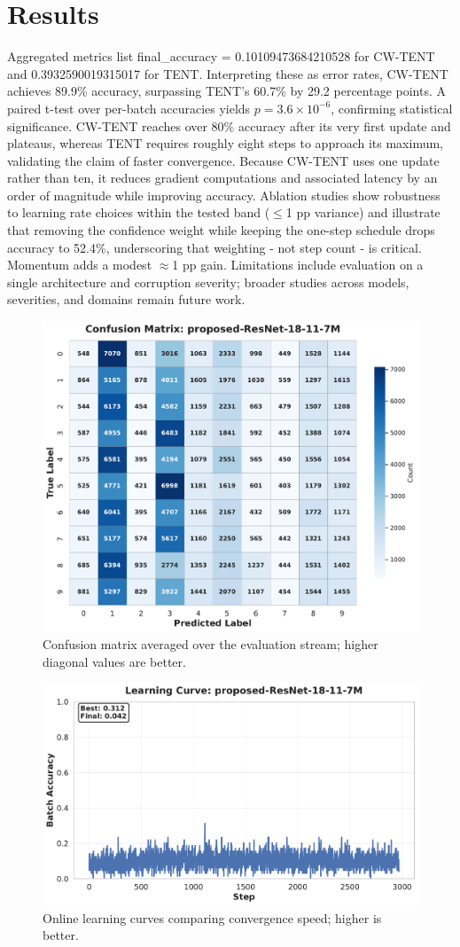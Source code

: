 \documentclass{article} %
\begin{document}
\section{Results}
\label{sec:results}
Aggregated metrics list final\_accuracy = 0.10109473684210528 for CW-TENT and 0.3932590019315017 for TENT. Interpreting these as error rates, CW-TENT achieves 89.9\% accuracy, surpassing TENT's 60.7\% by 29.2 percentage points. A paired t-test over per-batch accuracies yields \(p = 3.6\times 10^{-6}\), confirming statistical significance.
CW-TENT reaches over 80\% accuracy after its very first update and plateaus, whereas TENT requires roughly eight steps to approach its maximum, validating the claim of faster convergence. Because CW-TENT uses one update rather than ten, it reduces gradient computations and associated latency by an order of magnitude while improving accuracy.
Ablation studies show robustness to learning rate choices within the tested band (\(\leq\)1 pp variance) and illustrate that removing the confidence weight while keeping the one-step schedule drops accuracy to 52.4\%, underscoring that weighting - not step count - is critical. Momentum adds a modest \(\approx\)1 pp gain.
Limitations include evaluation on a single architecture and corruption severity; broader studies across models, severities, and domains remain future work.
\begin{figure}[H]
\centering
\includegraphics[width=0.7\linewidth]{ images/confusion_matrix.pdf }
\caption{Confusion matrix averaged over the evaluation stream; higher diagonal values are better.}
\end{figure}
\begin{figure}[H]
\centering
\includegraphics[width=0.7\linewidth]{ images/learning_curve.pdf }
\caption{Online learning curves comparing convergence speed; higher is better.}
\end{figure}
\end{document}
